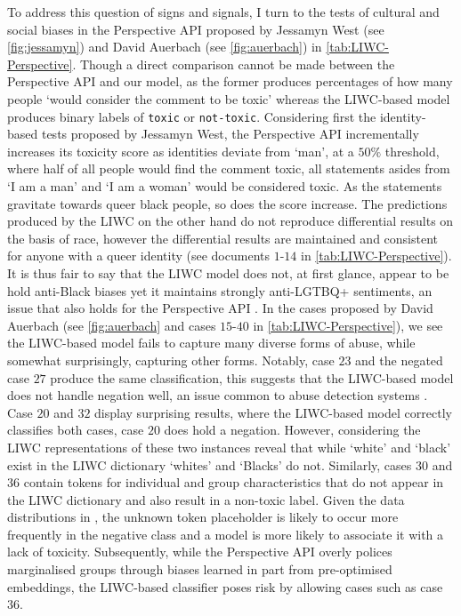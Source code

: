 To address this question of signs and signals, I turn to the tests of cultural and social biases in the Perspective API proposed by Jessamyn West (see \autoref{fig:jessamyn}) and David Auerbach (see \autoref{fig:auerbach}) in \autoref{tab:LIWC-Perspective}.
Though a direct comparison cannot be made between the Perspective API and our model, as the former produces percentages of how many people `would consider the comment to be toxic' \citep{Perspective:Github} whereas the LIWC-based model produces binary labels of \texttt{toxic} or \texttt{not-toxic}.
Considering first the identity-based tests proposed by Jessamyn West, the Perspective API incrementally increases its toxicity score as identities deviate from `man', at a $50\%$ threshold, where half of all people would find the comment toxic, all statements asides from `I am a man' and `I am a woman' would be considered toxic.
As the statements gravitate towards queer black people, so does the score increase.
The predictions produced by the LIWC on the other hand do not reproduce differential results on the basis of race, however the differential results are maintained and consistent for anyone with a queer identity (see documents $1$-$14$ in \autoref{tab:LIWC-Perspective}).
It is thus fair to say that the LIWC model does not, at first glance, appear to be hold anti-Black biases yet it maintains strongly anti-LGTBQ+ sentiments, an issue that also holds for the Perspective API \citep{Dias:2021}.
In the cases proposed by David Auerbach (see \autoref{fig:auerbach} and cases $15$-$40$ in \autoref{tab:LIWC-Perspective}), we see  the LIWC-based model fails to capture many diverse forms of abuse, while somewhat surprisingly, capturing other forms.
Notably, case $23$ and the negated case $27$ produce the same classification, this suggests that the LIWC-based model does not handle negation well, an issue common to abuse detection systems \cite{Rottger:2021}.
Case $20$ and $32$  display surprising results, where the LIWC-based model correctly classifies both cases,  case $20$ does hold a negation.
However, considering the LIWC representations of these two instances reveal that while `white' and `black' exist in the LIWC dictionary `whites' and `Blacks' do not.
Similarly, cases $30$ and $36$ contain tokens for individual and group characteristics that do not appear in the LIWC dictionary and also result in a non-toxic label.
Given the data distributions in \citet{Wulczyn:2017}, the unknown token placeholder is likely to occur more frequently in the negative class and a model is more likely to associate it with a lack of toxicity.
Subsequently, while the Perspective API overly polices marginalised groups through biases learned in part from pre-optimised embeddings, the LIWC-based classifier poses risk by allowing cases such as case $36$.

